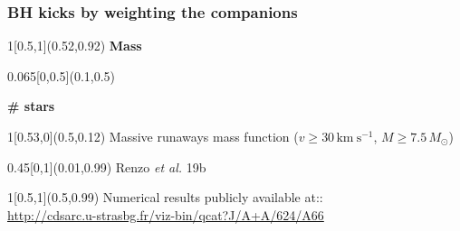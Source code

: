 \documentclass[xcolor=dvipsnames,professionalfonts, aspectratio=169]{beamer}
\begin{document}
\begin{frame}
  \frametitle{BH kicks by weighting the companions}
  \centering
    \begin{textblock}{1}[0.5,1](0.52,0.92)
      \bf Mass
    \end{textblock}
    \begin{textblock}{0.065}[0,0.5](0.1,0.5)
      \begin{sideways}
        \bf \# stars
      \end{sideways}
    \end{textblock}



  \begin{textblock}{1}[0.53,0](0.5,0.12)
      \centering
      \small
      {Massive runaways mass function
        ($v\geq30\,\mathrm{km\ s^{-1}}$, $M\geq7.5\,M_\odot$)}
  \end{textblock}
  \begin{textblock}{0.45}[0,1](0.01,0.99)
    \textcolor{gray!50}{\tiny Renzo \emph{et al.} 19b}\hfill\,
  \end{textblock}

  \begin{textblock}{1}[0.5,1](0.5,0.99)
    \centering
    \textcolor{gray!50}{\tiny Numerical results publicly available at::\\[-5pt]
      \href{http://cdsarc.u-strasbg.fr/viz-bin/qcat?J/A+A/624/A66}{http://cdsarc.u-strasbg.fr/viz-bin/qcat?J/A+A/624/A66}}
  \end{textblock}
\end{frame}
\end{document}
